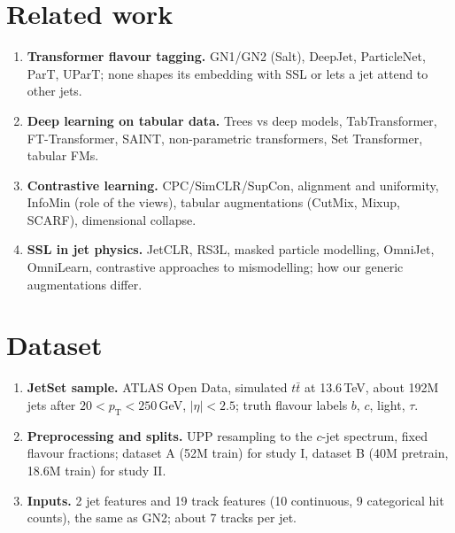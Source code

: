 \documentclass[11pt,a4paper]{article}
\begin{document}
\section{Related work}
\begin{enumerate}
  \item \textbf{Transformer flavour tagging.} GN1/GN2 (Salt), DeepJet, ParticleNet, ParT,
        UParT; none shapes its embedding with SSL or lets a jet attend to other jets.
  \item \textbf{Deep learning on tabular data.} Trees vs deep models, TabTransformer,
        FT-Transformer, SAINT, non-parametric transformers, Set Transformer, tabular FMs.
  \item \textbf{Contrastive learning.} CPC/SimCLR/SupCon, alignment and uniformity, InfoMin
        (role of the views), tabular augmentations (CutMix, Mixup, SCARF), dimensional collapse.
  \item \textbf{SSL in jet physics.} JetCLR, RS3L, masked particle modelling, OmniJet, OmniLearn,
        contrastive approaches to mismodelling; how our generic augmentations differ.
\end{enumerate}

\section{Dataset}
\begin{enumerate}
  \item \textbf{JetSet sample.} ATLAS Open Data, simulated $t\bar t$ at 13.6\,TeV, about 192M
        jets after $20<p_\mathrm{T}<250$\,GeV, $|\eta|<2.5$; truth flavour labels $b$, $c$, light, $\tau$.
  \item \textbf{Preprocessing and splits.} UPP resampling to the $c$-jet spectrum, fixed flavour
        fractions; dataset A (52M train) for study I, dataset B (40M pretrain, 18.6M train) for study II.
  \item \textbf{Inputs.} 2 jet features and 19 track features (10 continuous, 9 categorical hit
        counts), the same as GN2; about 7 tracks per jet.
\end{enumerate}

\end{document}
